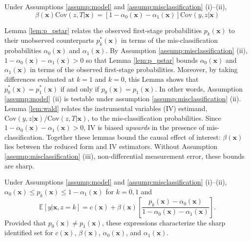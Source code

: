 \begin{lem}
  \label{lem:wald}
  Under Assumptions \ref{assump:model} and \ref{assump:misclassification} (i)--(ii), $$\beta(\mathbf{x}) \mbox{Cov}(z,T|\mathbf{x}) = \left[ 1 - \alpha_0(\mathbf{x}) - \alpha_1(\mathbf{x}) \right]\mbox{Cov}(y,z|\mathbf{x})$$
\end{lem}

Lemma \ref{lem:p_pstar} relates the observed first-stage probabilities $p_k(\mathbf{x})$ to their unobserved counterparts $p^*_k(\mathbf{x})$ in terms of the mis-classification probabilities $\alpha_0(\mathbf{x})$ and $\alpha_1(\mathbf{x})$.
By Assumption \ref{assump:misclassification} (ii), $1 - \alpha_0(\mathbf{x}) - \alpha_1(\mathbf{x}) > 0$ so that Lemma \ref{lem:p_pstar} bounds $\alpha_0(\mathbf{x})$ and $\alpha_1(\mathbf{x})$ in terms of the observed first-stage probabilities.
Moreover, by taking differences evaluated at $k=1$ and $k=0$, this Lemma shows that $p_0^*(\mathbf{x}) = p_1^*(\mathbf{x})$ if and only if $p_0(\mathbf{x})=p_1(\mathbf{x})$.
In other words, Assumption \ref{assump:model} (ii) is testable under assumption \ref{assump:misclassification} (ii).
Lemma \ref{lem:wald} relates the instrumental variables (IV) estimand, $\mbox{Cov}(y,z|\mathbf{x})/\mbox{Cov}(z,T|\mathbf{x})$, to the mis-classification probabilities.
Since $1 - \alpha_0(\mathbf{x}) - \alpha_1(\mathbf{x}) > 0$, IV is biased \emph{upwards} in the presence of mis-classification.
Together these lemmas bound the causal effect of interest: $\beta(\mathbf{x})$ lies between the reduced form and IV estimators.
Without Assumption \ref{assump:misclassification} (iii), non-differential measurement error, these bounds are sharp.

\begin{thm}
  Under Assumptions \ref{assump:model} and \ref{assump:misclassification} (i)--(ii), $\alpha_0(\mathbf{x}) \leq p_k(\mathbf{x}) \leq 1 -  \alpha_1(\mathbf{x})$ for  $k = 0, 1$ and
  \begin{equation}
    \mathbb{E}[y|\mathbf{x},z=k] = c(\mathbf{x}) + \beta(\mathbf{x}) \left[\frac{p_k(\mathbf{x}) - \alpha_0(\mathbf{x})}{1 - \alpha_0(\mathbf{x}) - \alpha_1(\mathbf{x})}\right].
    \label{eq:identsetI}
  \end{equation}
Provided that $p_0(\mathbf{x}) \neq p_1(\mathbf{x})$, these expressions characterize the sharp identified set for $c(\mathbf{x})$, $\beta(\mathbf{x})$, $\alpha_0(\mathbf{x})$, and $\alpha_1(\mathbf{x})$.
  \label{thm:sharpI}
\end{thm}


